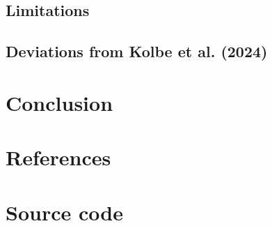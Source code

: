 \documentclass{article}
\begin{document}
\subsection{Limitations}

\subsection{Deviations from Kolbe et al. (2024)}

\section{Conclusion}

\section*{References}

\appendix
\section{Source code}
\end{document}
